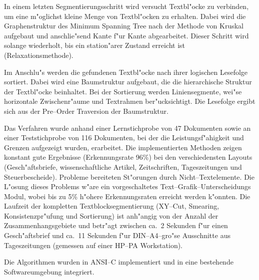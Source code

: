 In einem letzten Segmentierungsschritt wird versucht Textbl"ocke zu verbinden, um eine m"oglichst
kleine Menge von Textbl"ocken zu erhalten. Dabei wird die Graphenstruktur des Minimum Spanning
Tree nach der Methode von Kruskal aufgebaut und anschlie"send Kante f"ur Kante abgearbeitet.
Dieser Schritt wird solange wiederholt, bis ein station"arer Zustand erreicht ist
(Relaxationsmethode).

Im Anschlu"s werden die gefundenen Textbl"ocke nach ihrer logischen Lesefolge sortiert. Dabei
wird eine Baumstruktur aufgebaut, die die hierarchische Struktur der Textbl"ocke
beinhaltet. Bei der Sortierung werden Liniensegmente, wei"se horizontale Zwischenr"aume und Textrahmen ber"ucksichtigt.
Die Lesefolge ergibt sich aus der Pre--Order Traversion der Baumstruktur.

Das Verfahren wurde anhand einer Lernstichprobe von 47 Dokumenten sowie an einer
Teststichprobe von 116 Dokumenten, bei der die Leistungsf"ahigkeit und Grenzen aufgezeigt wurden, 
erarbeitet.
Die implementierten Methoden zeigen konstant gute Ergebnisse (Erkennungsrate 96\%) 
bei den verschiedensten Layouts (Gesch"aftsbriefe, wissenschaftliche Artikel, Zeitschriften,
Tageszeitungen und Steuerbescheide). 
Probleme bereiteten St"orungen durch Nicht--Textelemente. 
Die L"osung dieses Problems w"are ein vorgeschaltetes 
Text--Grafik--Unterscheidungs Modul, 
wobei bis zu 5\% h"ohere Erkennungsraten erreicht werden k"onnten.
Die Laufzeit der kompletten Textblocksegmentierung (XY--Cut, Smearing, Konsistenzpr"ufung und
Sortierung) ist anh"angig von der Anzahl der Zusammenhangsgebiete und 
betr"agt zwischen ca.\ 2 Sekunden f"ur einen Gesch"aftsbrief und ca.\ 11 Sekunden 
f"ur DIN--A4--gro"se Ausschnitte aus Tageszeitungen (gemessen auf einer HP--PA Workstation).

Die Algorithmen wurden in ANSI--C implementiert und in eine bestehende Softwareumgebung
integriert. 


